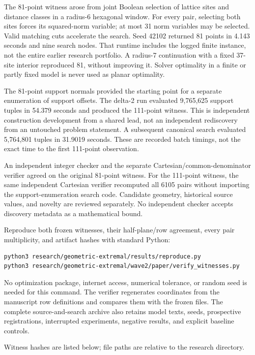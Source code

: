 \documentclass[
]{article}
\begin{document}
The 81-point witness arose from joint Boolean selection of lattice sites
and distance classes in a radius-6 hexagonal window. For every pair,
selecting both sites forces its squared-norm variable; at most 31 norm
variables may be selected. Valid matching cuts accelerate the search.
Seed 42102 returned 81 points in 4.143 seconds and nine search nodes.
That runtime includes the logged finite instance, not the entire earlier
research portfolio. A radius-7 continuation with a fixed 37-site
interior reproduced 81, without improving it. Solver optimality in a
finite or partly fixed model is never used as planar optimality.

The 81-point support normals provided the starting point for a separate
enumeration of support offsets. The delta-2 run evaluated 9,765,625
support tuples in 54.379 seconds and produced the 111-point witness.
This is independent construction development from a shared lead, not an
independent rediscovery from an untouched problem statement. A
subsequent canonical search evaluated 5,764,801 tuples in 31.9019
seconds. These are recorded batch timings, not the exact time to the
first 111-point observation.

An independent integer checker and the separate
Cartesian/common-denominator verifier agreed on the original 81-point
witness. For the 111-point witness, the same independent Cartesian
verifier recomputed all 6105 pairs without importing the
support-enumeration search code. Candidate geometry, historical source
values, and novelty are reviewed separately. No independent checker
accepts discovery metadata as a mathematical bound.

Reproduce both frozen witnesses, their half-plane/row agreement, every
pair multiplicity, and artifact hashes with standard Python:

\begin{verbatim}
python3 research/geometric-extremal/results/reproduce.py
python3 research/geometric-extremal/wave2/paper/verify_witnesses.py
\end{verbatim}

No optimization package, internet access, numerical tolerance, or random
seed is needed for this command. The verifier regenerates coordinates
from the manuscript row definitions and compares them with the frozen
files. The complete source-and-search archive also retains model texts,
seeds, prospective registrations, interrupted experiments, negative
results, and explicit baseline controls.

Witness hashes are listed below; file paths are relative to the research
directory.
\end{document}
